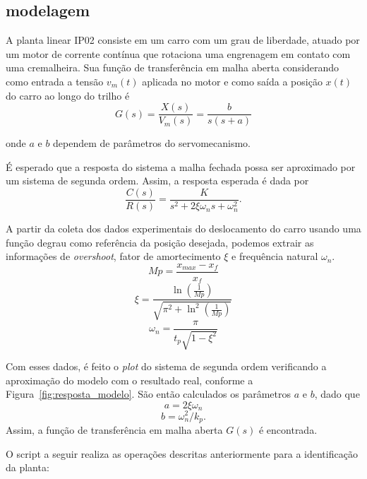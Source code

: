 \documentclass{article}
\begin{document}
\subsection{modelagem}
{
    A planta linear IP02 consiste em um carro com um grau de liberdade, atuado por um motor de corrente contínua que rotaciona uma engrenagem em contato com uma cremalheira. Sua função de transferência em malha aberta considerando como entrada a tensão $v_m(t)$ aplicada no motor e como saída a posição $x(t)$ do carro ao longo do trilho é
    \begin{equation}
        G(s) = \frac{X(s)}{V_m(s)} = \frac{b}{s(s+a)}
    \end{equation}

    onde $a$ e $b$ dependem de parâmetros do servomecanismo. 

    É esperado que a resposta do sistema a malha fechada possa ser aproximado por um sistema de segunda ordem. Assim, a resposta esperada é dada por
    \begin{equation}
        \frac{C(s)}{R(s)} = \frac{K}{s^2 + 2\xi\omega_ns + \omega^2_n}.
    \end{equation}
    
    A partir da coleta dos dados experimentais do deslocamento do carro usando uma função degrau como referência da posição desejada, podemos extrair as informações de \textit{overshoot}, fator de amortecimento $\xi$ e frequência natural $\omega_n$.
    \begin{equation}
        Mp = \frac{x_{max} - x_f}{x_f}
    \end{equation}
    \begin{equation}
        \xi = \frac{\ln{(\frac{1}{Mp})}}{\sqrt{\pi^2 + \ln^2{(\frac{1}{Mp})}}}
    \end{equation}
    \begin{equation}
        \omega_n = \frac{\pi}{t_p\sqrt{1 - \xi^2}}
    \end{equation}
    
    Com esses dados, é feito o \textit{plot} do sistema de segunda ordem verificando a aproximação do modelo com o resultado real, conforme a Figura~\ref{fig:resposta_modelo}. São então calculados os parâmetros $a$ e $b$, dado que
    \begin{equation}
        a = 2\xi\omega_n
    \end{equation}
    \begin{equation}
        b = \omega_n^2 / k_p.
    \end{equation}
    Assim, a função de transferência em malha aberta $G(s)$ é encontrada.
    
    O script a seguir realiza as operações descritas anteriormente para a identificação da planta:
}
\end{document}
